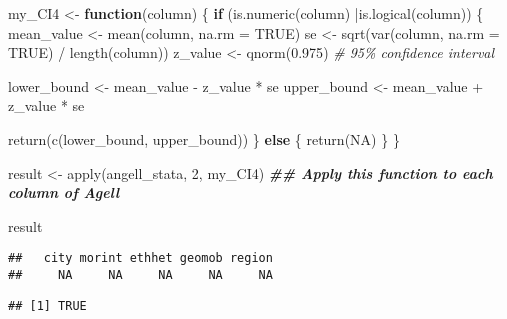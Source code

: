 \documentclass[
  12pt,
]{article}
\newenvironment{Shaded}{\begin{snugshade}}{\end{snugshade}}
\newcommand{\AttributeTok}[1]{\textcolor[rgb]{0.77,0.63,0.00}{#1}}
\newcommand{\CommentTok}[1]{\textcolor[rgb]{0.56,0.35,0.01}{\textit{#1}}}
\newcommand{\ConstantTok}[1]{\textcolor[rgb]{0.00,0.00,0.00}{#1}}
\newcommand{\ControlFlowTok}[1]{\textcolor[rgb]{0.13,0.29,0.53}{\textbf{#1}}}
\newcommand{\DecValTok}[1]{\textcolor[rgb]{0.00,0.00,0.81}{#1}}
\newcommand{\DocumentationTok}[1]{\textcolor[rgb]{0.56,0.35,0.01}{\textbf{\textit{#1}}}}
\newcommand{\FloatTok}[1]{\textcolor[rgb]{0.00,0.00,0.81}{#1}}
\newcommand{\FunctionTok}[1]{\textcolor[rgb]{0.00,0.00,0.00}{#1}}
\newcommand{\NormalTok}[1]{#1}
\newcommand{\OtherTok}[1]{\textcolor[rgb]{0.56,0.35,0.01}{#1}}
\newcommand{\SpecialCharTok}[1]{\textcolor[rgb]{0.00,0.00,0.00}{#1}}
\begin{document}
\begin{Shaded}
\begin{Highlighting}[]
\NormalTok{my\_CI4 }\OtherTok{\textless{}{-}} \ControlFlowTok{function}\NormalTok{(column) \{}
  \ControlFlowTok{if}\NormalTok{ (}\FunctionTok{is.numeric}\NormalTok{(column) }\SpecialCharTok{|}\FunctionTok{is.logical}\NormalTok{(column)) \{}
\NormalTok{    mean\_value }\OtherTok{\textless{}{-}} \FunctionTok{mean}\NormalTok{(column, }\AttributeTok{na.rm =} \ConstantTok{TRUE}\NormalTok{)}
\NormalTok{    se }\OtherTok{\textless{}{-}} \FunctionTok{sqrt}\NormalTok{(}\FunctionTok{var}\NormalTok{(column, }\AttributeTok{na.rm =} \ConstantTok{TRUE}\NormalTok{) }\SpecialCharTok{/} \FunctionTok{length}\NormalTok{(column))}
\NormalTok{    z\_value }\OtherTok{\textless{}{-}} \FunctionTok{qnorm}\NormalTok{(}\FloatTok{0.975}\NormalTok{)  }\CommentTok{\# 95\% confidence interval}
    
\NormalTok{    lower\_bound }\OtherTok{\textless{}{-}}\NormalTok{ mean\_value }\SpecialCharTok{{-}}\NormalTok{ z\_value }\SpecialCharTok{*}\NormalTok{ se}
\NormalTok{    upper\_bound }\OtherTok{\textless{}{-}}\NormalTok{ mean\_value }\SpecialCharTok{+}\NormalTok{ z\_value }\SpecialCharTok{*}\NormalTok{ se}
    
    \FunctionTok{return}\NormalTok{(}\FunctionTok{c}\NormalTok{(lower\_bound, upper\_bound))}
\NormalTok{  \} }\ControlFlowTok{else}\NormalTok{ \{}
    \FunctionTok{return}\NormalTok{(}\ConstantTok{NA}\NormalTok{)}
\NormalTok{  \}}
\NormalTok{\}}


\NormalTok{result }\OtherTok{\textless{}{-}} \FunctionTok{apply}\NormalTok{(angell\_stata, }\DecValTok{2}\NormalTok{, my\_CI4) }\DocumentationTok{\#\# Apply this function to each column of Agell}

\NormalTok{result}
\end{Highlighting}
\end{Shaded}

\begin{verbatim}
##   city morint ethhet geomob region 
##     NA     NA     NA     NA     NA
\end{verbatim}

\begin{Shaded}
\end{Shaded}

\begin{verbatim}
## [1] TRUE
\end{verbatim}
\end{document}
